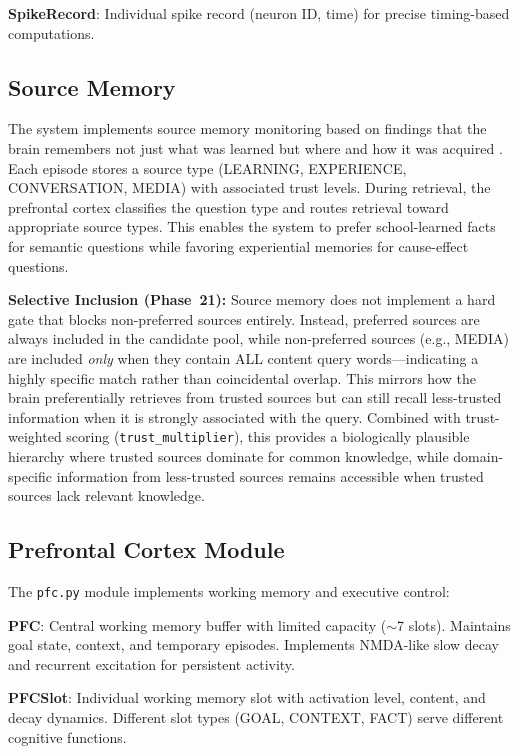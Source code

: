 \documentclass[11pt]{article}
\begin{document}
\textbf{SpikeRecord}: Individual spike record (neuron ID, time) for precise timing-based computations.

\subsection{Source Memory}

The system implements source memory monitoring based on findings that the brain
remembers not just what was learned but where and how it was acquired
\citep{johnson1993source}. Each episode stores a source type (LEARNING, EXPERIENCE,
CONVERSATION, MEDIA) with associated trust levels. During retrieval, the prefrontal
cortex classifies the question type and routes retrieval toward appropriate source
types. This enables the system to prefer school-learned facts for semantic questions
while favoring experiential memories for cause-effect questions.

\textbf{Selective Inclusion (Phase~21):} Source memory does not implement a hard gate
that blocks non-preferred sources entirely. Instead, preferred sources are always
included in the candidate pool, while non-preferred sources (e.g., MEDIA) are
included \emph{only} when they contain ALL content query words---indicating a
highly specific match rather than coincidental overlap. This mirrors how the brain
preferentially retrieves from trusted sources but can still recall less-trusted
information when it is strongly associated with the query. Combined with
trust-weighted scoring (\texttt{trust\_multiplier}), this provides a biologically
plausible hierarchy where trusted sources dominate for common knowledge, while
domain-specific information from less-trusted sources remains accessible when
trusted sources lack relevant knowledge.

\subsection{Prefrontal Cortex Module}

The \texttt{pfc.py} module implements working memory and executive control:

\textbf{PFC}: Central working memory buffer with limited capacity ($\sim$7 slots). Maintains goal state, context, and temporary episodes. Implements NMDA-like slow decay and recurrent excitation for persistent activity.

\textbf{PFCSlot}: Individual working memory slot with activation level, content, and decay dynamics. Different slot types (GOAL, CONTEXT, FACT) serve different cognitive functions.
\end{document}
